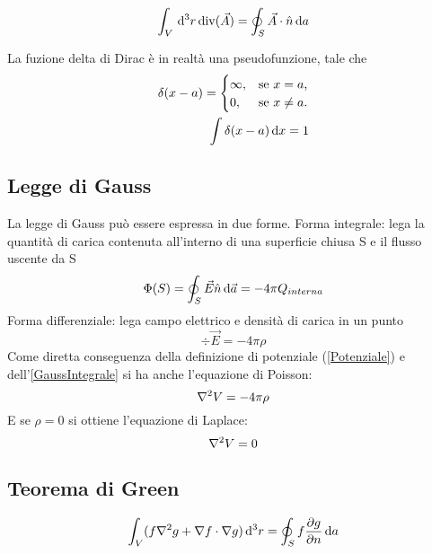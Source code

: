 \documentclass[../main.tex]{subfiles}
\begin{document}
\begin{theorem}
  \label{ThDivergenza}
  \begin{equation}
    \int_V \,\mathrm d^3 r \operatorname{div}(\vec A) = \oint_S \vec A \cdot \hat n \,\mathrm d a
  \end{equation}
\end{theorem}

\begin{definition}
La fuzione delta di Dirac è in realtà una pseudofunzione, tale che
  \begin{subequations}
    \label{DeltaDirac}
    \begin{align}
      \delta(x-a)=
      \begin{cases}
	\infty,	& \text{se $x=a$,} \\
	0, 	& \text{se $x \neq a$.}
      \end{cases}\\
      \int \delta (x-a) \,\mathrm d x =1
    \end{align}
  \end{subequations}
\end{definition}

\subsection{Legge di Gauss}\label{Gauss}
La legge di Gauss può essere espressa in due forme.\newline
Forma integrale: lega la quantità di carica contenuta all'interno di una superficie chiusa S e il flusso uscente da S
\begin{equation}
  \label{GaussIntegrale}
  \Phi(S)= \oint_S \vec E \hat n \,\mathrm d \vec a=-4\pi Q_{interna}
\end{equation}
Forma differenziale: lega campo elettrico e densità di carica in un punto 
\begin{equation}
  \label{GaussDifferenziale}
  \div \vec E=-4\pi\rho
\end{equation}
Come diretta conseguenza della definizione di potenziale (\cref{Potenziale}) e dell'\cref{GaussIntegrale} si ha anche l'equazione di Poisson:
\begin{equation}
  \label{Poisson}
  \nabla^2 V= -4\pi \rho
\end{equation}
E se $\rho=0$ si ottiene l'equazione di Laplace:
\begin{equation}
  \label{Laplace}
  \nabla^2 V= 0
\end{equation}


\subsection{Teorema di Green}\label{Green}
\begin{theorem}
  \label{Green1}
  \begin{equation}
  \int_V (f \nabla^2 g + \nabla f \cdot \nabla g) \,\mathrm d^3 r = \oint_S f \frac{\partial g}{\partial n} \,\mathrm d a
  \end{equation}
\end{theorem}
\end{document}
